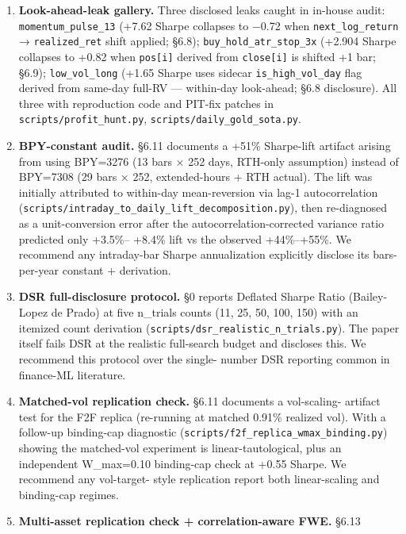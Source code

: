 \documentclass[
]{article}
\begin{document}
\begin{enumerate}
\def\labelenumi{\arabic{enumi}.}
\item
  \textbf{Look-ahead-leak gallery.} Three disclosed leaks caught in
  in-house audit: \texttt{momentum\_pulse\_13} (+7.62 Sharpe collapses
  to −0.72 when \texttt{next\_log\_return} → \texttt{realized\_ret}
  shift applied; §6.8); \texttt{buy\_hold\_atr\_stop\_3x} (+2.904 Sharpe
  collapses to +0.82 when \texttt{pos{[}i{]}} derived from
  \texttt{close{[}i{]}} is shifted +1 bar; §6.9);
  \texttt{low\_vol\_long} (+1.65 Sharpe uses sidecar
  \texttt{is\_high\_vol\_day} flag derived from same-day full-RV ---
  within-day look-ahead; §6.8 disclosure). All three with reproduction
  code and PIT-fix patches in \texttt{scripts/profit\_hunt.py},
  \texttt{scripts/daily\_gold\_sota.py}.
\item
  \textbf{BPY-constant audit.} §6.11 documents a +51\% Sharpe-lift
  artifact arising from using BPY=3276 (13 bars × 252 days, RTH-only
  assumption) instead of BPY=7308 (29 bars × 252, extended-hours + RTH
  actual). The lift was initially attributed to within-day
  mean-reversion via lag-1 autocorrelation
  (\texttt{scripts/intraday\_to\_daily\_lift\_decomposition.py}), then
  re-diagnosed as a unit-conversion error after the
  autocorrelation-corrected variance ratio predicted only +3.5\%--
  +8.4\% lift vs the observed +44\%--+55\%. We recommend any
  intraday-bar Sharpe annualization explicitly disclose its
  bars-per-year constant + derivation.
\item
  \textbf{DSR full-disclosure protocol.} §0 reports Deflated Sharpe
  Ratio (Bailey-Lopez de Prado) at five n\_trials counts (11, 25, 50,
  100, 150) with an itemized count derivation
  (\texttt{scripts/dsr\_realistic\_n\_trials.py}). The paper itself
  fails DSR at the realistic full-search budget and discloses this. We
  recommend this protocol over the single- number DSR reporting common
  in finance-ML literature.
\item
  \textbf{Matched-vol replication check.} §6.11 documents a vol-scaling-
  artifact test for the F2F replica (re-running at matched 0.91\%
  realized vol). With a follow-up binding-cap diagnostic
  (\texttt{scripts/f2f\_replica\_wmax\_binding.py}) showing the
  matched-vol experiment is linear-tautological, plus an independent
  W\_max=0.10 binding-cap check at +0.55 Sharpe. We recommend any
  vol-target- style replication report both linear-scaling and
  binding-cap regimes.
\item
  \textbf{Multi-asset replication check + correlation-aware FWE.} §6.13

\end{enumerate}
\end{document}
